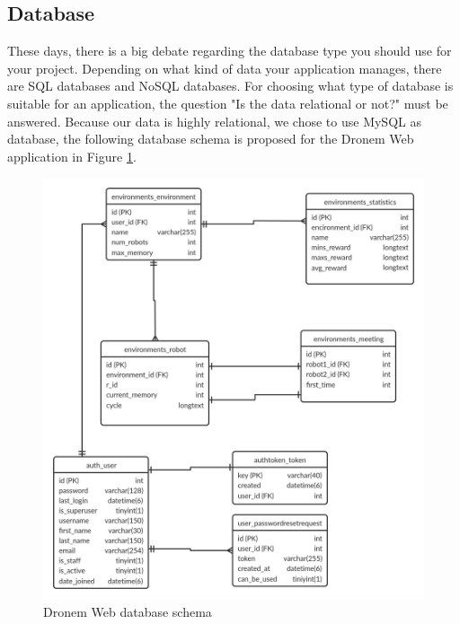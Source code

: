 \subsection{Database}
These days, there is a big debate regarding the database type you should use for your project. Depending on what kind of data your application manages, there are SQL databases and NoSQL databases. For choosing what type of database is suitable for an application, the question "Is the data relational or not?" must be answered. Because our data is highly relational, we chose to use MySQL \cite{MySQL} as database, the following database schema is proposed for the Dronem Web application in Figure \ref{fig:dataBaseSchema}.


\begin{figure}[!htb]
    \centering
    \includegraphics[scale=0.2]{Figures/databaseDiagram.jpg}
    \caption{Dronem Web database schema}
    \label{fig:dataBaseSchema}
\end{figure}{}

